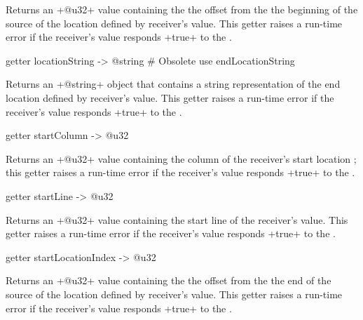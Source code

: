 Returns an \ggsq+@u32+ value containing the the offset from the the beginning of the source of the location defined by receiver's value. This getter raises a run-time error if the receiver's value responds \ggsq+true+ to the .




\begin{galgas4}
getter locationString -> @string # Obsolete use endLocationString
\end{galgas4}

Returns an \ggsq+@string+ object that contains a string representation of the end location defined by receiver's value. This getter raises a run-time error if the receiver's value responds \ggsq+true+ to the .




\begin{galgas4}
getter startColumn -> @u32
\end{galgas4}

Returns an \ggsq+@u32+ value containing the column of the receiver's start location ; this getter raises a run-time error if the receiver's value responds \ggsq+true+ to the .



\begin{galgas4}
getter startLine -> @u32
\end{galgas4}

Returns an \ggsq+@u32+ value containing the start line of the receiver's value. This getter raises a run-time error if the receiver's value responds \ggsq+true+ to the .




\begin{galgas4}
getter startLocationIndex -> @u32
\end{galgas4}

Returns an \ggsq+@u32+ value containing the the offset from the the end of the source of the location defined by receiver's value. This getter raises a run-time error if the receiver's value responds \ggsq+true+ to the .


